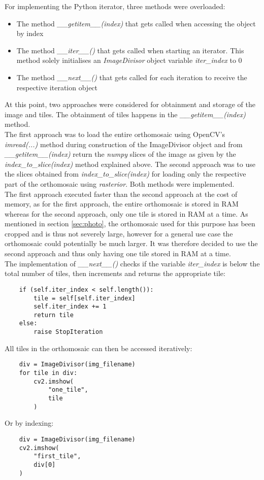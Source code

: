 \documentclass[../Head/Main.tex]{subfiles}
\begin{document}
For implementing the Python iterator, three methods were overloaded:
\begin{itemize}
\item The method \textit{\_\_getitem\_\_(index)} that gets called when accessing the object by index
\item The method \textit{\_\_iter\_\_()} that gets called when starting an iterator. This method solely initialises an \textit{ImageDivisor} object variable \textit{iter\_index} to 0
\item The method \textit{\_\_next\_\_()} that gets called for each iteration to receive the respective iteration object
\end{itemize}
At this point, two approaches were considered for obtainment and storage of the image and tiles. The obtainment of tiles happens in the \textit{\_\_getitem\_\_(index)} method.\\
The first approach was to load the entire orthomosaic using OpenCV's \textit{imread(...)} method during construction of the ImageDivisor object and from \textit{\_\_getitem\_\_(index)} return the \textit{numpy} slices of the image as given by the \textit{index\_to\_slice(index)} method explained above. The second approach was to use the slices obtained from \textit{index\_to\_slice(index)} for loading only the respective part of the orthomosaic using \textit{rasterior}. Both methods were implemented.\\
The first approach executed faster than the second approach at the cost of memory, as for the first approach, the entire orthomosaic is stored in RAM whereas for the second approach, only one tile is stored in RAM at a time. As mentioned in section \ref{sec:photo}, the orthomosaic used for this purpose has been cropped and is thus not severely large, however for a general use case the orthomosaic could potentially be much larger. It was therefore decided to use the second approach and thus only having one tile stored in RAM at a time.\\
The implementation of \textit{\_\_next\_\_()} checks if the variable \textit{iter\_index} is below the total number of tiles, then increments and returns the appropriate tile:
\begin{verbatim}
    if (self.iter_index < self.length()):
        tile = self[self.iter_index]
        self.iter_index += 1
        return tile
    else:
        raise StopIteration
\end{verbatim}
All tiles in the orthomosaic can then be accessed iteratively:
\begin{verbatim}
    div = ImageDivisor(img_filename)
    for tile in div:
        cv2.imshow(
            "one_tile",
            tile
        )
\end{verbatim}
Or by indexing:
\begin{verbatim}
    div = ImageDivisor(img_filename)
    cv2.imshow(
        "first_tile",
        div[0]
    )
\end{verbatim}
\end{document}
